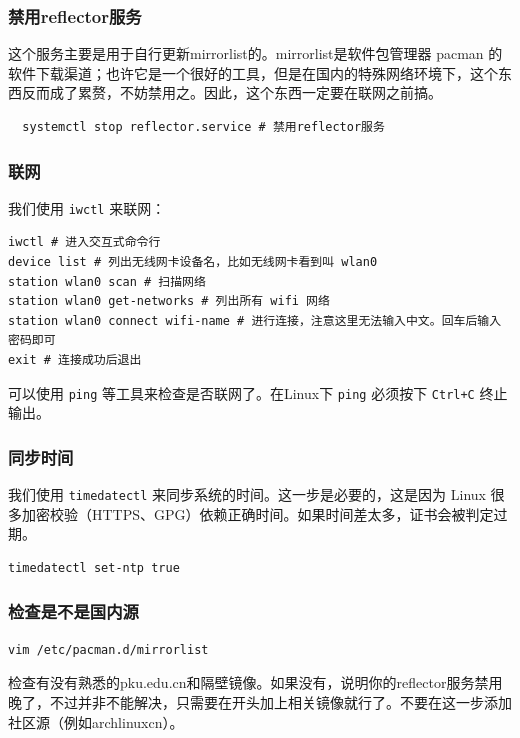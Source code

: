 \subsubsection{禁用reflector服务}

这个服务主要是用于自行更新mirrorlist的。mirrorlist是软件包管理器 pacman 的软件下载渠道；也许它是一个很好的工具，但是在国内的特殊网络环境下，这个东西反而成了累赘，不妨禁用之。因此，这个东西一定要在联网之前搞。

\begin{verbatim}
  systemctl stop reflector.service # 禁用reflector服务
\end{verbatim}

\subsubsection{联网}

我们使用 \texttt{iwctl} 来联网：

\begin{verbatim}
iwctl # 进入交互式命令行
device list # 列出无线网卡设备名，比如无线网卡看到叫 wlan0
station wlan0 scan # 扫描网络
station wlan0 get-networks # 列出所有 wifi 网络
station wlan0 connect wifi-name # 进行连接，注意这里无法输入中文。回车后输入密码即可
exit # 连接成功后退出
\end{verbatim}

可以使用 \texttt{ping} 等工具来检查是否联网了。在Linux下 \texttt{ping} 必须按下 \texttt{Ctrl+C} 终止输出。

\subsubsection{同步时间}

我们使用 \texttt{timedatectl} 来同步系统的时间。这一步是必要的，这是因为 Linux 很多加密校验（HTTPS、GPG）依赖正确时间。如果时间差太多，证书会被判定过期。

\begin{verbatim}
timedatectl set-ntp true
\end{verbatim}

\subsubsection{检查是不是国内源}

\begin{verbatim}
vim /etc/pacman.d/mirrorlist
\end{verbatim}

检查有没有熟悉的pku.edu.cn和隔壁镜像。如果没有，说明你的reflector服务禁用晚了，不过并非不能解决，只需要在开头加上相关镜像就行了。不要在这一步添加社区源（例如archlinuxcn）。

